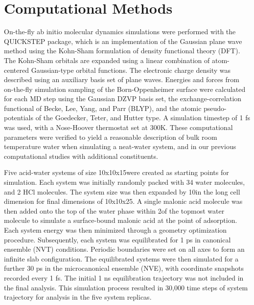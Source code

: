 \section {Computational Methods}

On-the-fly ab initio molecular dynamics simulations were performed with the QUICKSTEP package, which is an implementation of the Gaussian plane wave method using the Kohn-Sham formulation of density functional theory (DFT).\cite{VandeVondele2005} The Kohn-Sham orbitals are expanded using a linear combination of atom-centered Gaussian-type orbital functions. The electronic charge density was described using an auxiliary basis set of plane waves. Energies and forces from on-the-fly simulation sampling of the Born-Oppenheimer surface were calculated for each MD step using the Gaussian DZVP basis set, the exchange-correlation functional of Becke, Lee, Yang, and Parr (BLYP),\cite{Lee1988} and the atomic pseudo-potentials of the Goedecker, Teter, and Hutter type.\cite{Goedecker1996} A simulation timestep of 1 fs was used, with a Nose-Hoover thermostat set at 300K. These computational parameters were verified to yield a reasonable description of bulk room temperature water when simulating a neat-water system, and in our previous computational studies with additional constituents.\cite{Shamay2007}

Five acid-water systems of size 10x10x15\angs were created as starting points for simulation. Each system was initially randomly packed with 34 water molecules, and 2 HCl molecules. The system size was then expanded by 10\angs in the long cell dimension for final dimensions of 10x10x25\angs. A single malonic acid molecule was then added onto the top of the water phase within 2\angs of the topmost water molecule to simulate a surface-bound malonic acid at the point of adsorption. Each system energy was then minimized through a geometry optimization procedure. Subsequently, each system was equilibrated for 1 ps in canonical ensemble (NVT) conditions. Periodic boundaries were set on all axes to form an infinite slab configuration. The equilibrated systems were then simulated for a further 30 ps in the microcanonical ensemble (NVE), with coordinate snapshots recorded every 1 fs. The initial 1 ns equilibration trajectory was not included in the final analysis. This simulation process resulted in 30,000 time steps of system trajectory for analysis in the five system replicas.
